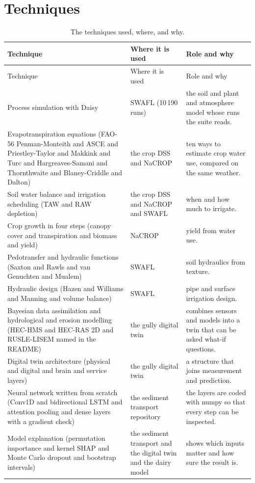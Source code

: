 \documentclass[11pt,a4paper]{article}
\begin{document}
\section{Techniques}
\begin{longtable}{@{}R{3.6cm}R{5.0cm}R{6.6cm}@{}}
\caption{The techniques used, where, and why.}\label{tab:tech}\\
\toprule Technique & Where it is used & Role and why\\\midrule\endfirsthead
\toprule Technique & Where it is used & Role and why\\\midrule\endhead
Process simulation with Daisy & SWAFL (10\,190 runs) & the soil and plant and atmosphere model whose runs the suite reads.\\
Evapotranspiration equations (FAO-56 Penman-Monteith and ASCE and Priestley-Taylor and Makkink and Turc and Hargreaves-Samani and Thornthwaite and Blaney-Criddle and Dalton) & the crop DSS and NaCROP & ten ways to estimate crop water use, compared on the same weather.\\
Soil water balance and irrigation scheduling (TAW and RAW depletion) & the crop DSS and NaCROP and SWAFL & when and how much to irrigate. \\
Crop growth in four steps (canopy cover and transpiration and biomass and yield) & NaCROP & yield from water use.\\
Pedotransfer and hydraulic functions (Saxton and Rawls and van Genuchten and Mualem) & SWAFL & soil hydraulics from texture.\\
Hydraulic design (Hazen and Williams and Manning and volume balance) & SWAFL & pipe and surface irrigation design.\\
Bayesian data assimilation and hydrological and erosion modelling (HEC-HMS and HEC-RAS 2D and RUSLE-LISEM named in the README) & the gully digital twin & combines sensors and models into a twin that can be asked what-if questions.\\
Digital twin architecture (physical and digital and brain and service layers) & the gully digital twin & a structure that joins measurement and prediction.\\
Neural network written from scratch (Conv1D and bidirectional LSTM and attention pooling and dense layers with a gradient check) & the sediment transport repository & the layers are coded with numpy so that every step can be inspected.\\
Model explanation (permutation importance and kernel SHAP and Monte Carlo dropout and bootstrap intervals) & the sediment transport and the digital twin and the dairy model & shows which inputs matter and how sure the result is.\\

\end{longtable}
\end{document}
